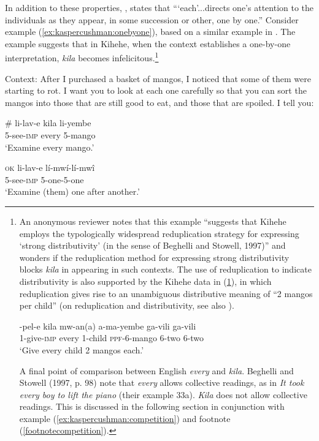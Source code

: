 \documentclass[letterpaper, 12pt]{article}
\begin{document}
In addition to these properties, \citealt[p. 150]{vendler62}, states that ```each'...directs one's attention to the individuals as they appear, in some succession or other, one by one.''  Consider example (\ref{ex:kaspercushman:onebyone}), based on a similar example in \citealt[p. 150]{vendler62}. The example suggests that in Kihehe, when the context establishes a one-by-one interpretation, \textit{kila} becomes infelicitous.\footnote{An anonymous reviewer notes that this example ``suggests that Kihehe employs the typologically widespread reduplication strategy for expressing `strong distributivity' (in the sense of Beghelli and Stowell, 1997)'' and wonders if the reduplication method for expressing strong distributivity blocks \textit{kila} in appearing in such contexts. The use of reduplication to indicate distributivity is also supported by the Kihehe data in (\ref{mangos}), in which reduplication gives rise to an unambiguous distributive meaning of ``2 mangos per child'' (on reduplication and distributivity, see also \citealt{balusu13}). 
\begin{exe}
\ex \label{mangos} \gll {}-pel-e kila mw-an(a) a-ma-yembe ga-vili ga-vili \\
1-give-\textsc{imp} every 1-child \textsc{ppf}-6-mango 6-two 6-two \\
`Give every child 2 mangos each.' \\
\end{exe}

A final point of comparison between English \textit{every} and \textit{kila}. Beghelli and Stowell (1997, p. 98) note that \textit{every} allows collective readings, as in \textit{It took every boy to lift the piano} (their example 33a). \textit{Kila} does not allow collective readings. This is discussed in the following section in conjunction with example (\ref{ex:kaspercushman:competition}) and footnote (\ref{footnotecompetition}).}

\begin{exe}
\singlespacing
 \ex Context: After I purchased a basket of mangos, I noticed that some of them were starting to rot. I want you to look at each one carefully so that you can sort the mangos into those that are still good to eat, and those that are spoiled. I tell you: \label{ex:kaspercushman:onebyone} \\

\begin{xlist}

\ex \gll \# li-lav-e kila li-yembe \\
{} 5-see-\textsc{imp} every 5-mango \\
`Examine every mango.' \\

\vspace{5mm}

\ex \gll \textsc{ok} li-lav-e l\'i-mw\'i-l\'i-mw\^i \\
{} 5-see-\textsc{imp} 5-one-5-one \\ \label{reduplication}
`Examine (them) one after another.'

\end{xlist}
\end{exe}
\end{document}
